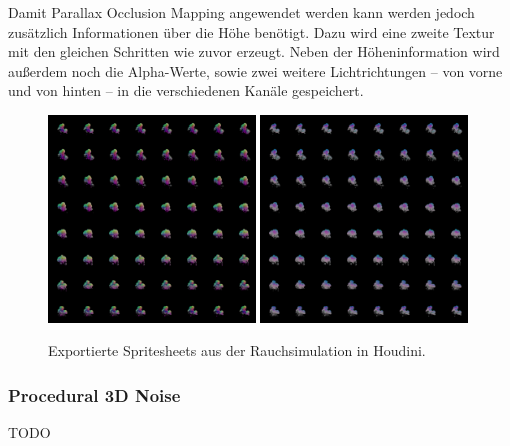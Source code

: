 Damit Parallax Occlusion Mapping angewendet werden kann werden jedoch zusätzlich Informationen über die Höhe benötigt.
Dazu wird eine zweite Textur mit den gleichen Schritten wie zuvor erzeugt. Neben der Höheninformation wird außerdem noch die Alpha-Werte, sowie zwei weitere Lichtrichtungen –
von vorne und von hinten – in die verschiedenen Kanäle gespeichert.




\begin{figure}[h!]
	\centering
	\includegraphics[width=0.49\textwidth]{Grafiken/Implementation/Lightmaps/smokeSim_T1.png}
	\includegraphics[width=0.49\textwidth]{Grafiken/Implementation/Lightmaps/smokeSim_T2.png}
	\begin{footnotesize}
		\caption{Exportierte Spritesheets aus der Rauchsimulation in Houdini. }
		\label{fig:flipbook}
	\end{footnotesize}
\end{figure}


\subsubsection{Procedural 3D Noise}
TODO







